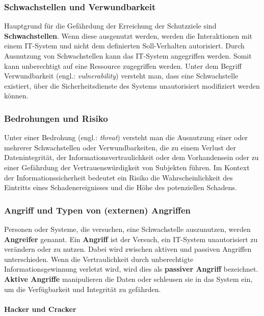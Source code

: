 \subsubsection{Schwachstellen und Verwundbarkeit}

Hauptgrund für die Gefährdung der Erreichung der Schutzziele sind \textbf{Schwachstellen}. Wenn diese ausgenutzt werden, werden die Interaktionen mit einem IT-System und nicht dem definierten Soll-Verhalten autorisiert. Durch Ausnutzung von Schwachstellen kann das IT-System angegriffen werden. Somit kann unberechtigt auf eine Ressource zugegriffen werden\cite[19--20]{nowey2011einleitung}. Unter dem Begriff Verwundbarkeit (engl.: \textit{vulnerability}) versteht man, dass eine Schwachstelle existiert, über die Sicherheitsdienste des Systems unautorisiert modifiziert werden können\cite[38]{eckert2013sicherheit}.

\subsubsection{Bedrohungen und Risiko}

Unter einer Bedrohung (engl.: \textit{threat}) versteht man die Ausnutzung einer oder mehrerer Schwachstellen oder Verwundbarkeiten, die zu einem Verlust der Datenintegrität, der Informationsvertraulichkeit oder dem Vorhandensein  oder zu einer Gefährdung der Vertrauenswürdigkeit von Subjekten führen\cite[39]{eckert2013sicherheit}. Im Kontext der Informationssicherheit bedeutet ein Risiko die Wahrscheinlichkeit des Eintritts eines Schadenereignisses und die Höhe des potenziellen Schadens\cite[15]{nowey2011einleitung}.

\subsubsection{Angriff und Typen von (externen) Angriffen}

Personen oder Systeme, die versuchen, eine Schwachstelle auszunutzen, werden \textbf{Angreifer} genannt. Ein \textbf{Angriff} ist der Versuch, ein IT-System unautorisiert zu verändern oder zu nutzen. Dabei wird zwischen aktiven und passiven Angriffen unterschieden. Wenn die Vertraulichkeit durch unberechtigte Informationsgewinnung verletzt wird, wird dies als \textbf{passiver Angriff} bezeichnet. \textbf{Aktive Angriffe} manipulieren die Daten oder schleusen sie in das System ein, um die Verfügbarkeit und Integrität zu gefährden\cite[20]{nowey2011einleitung}.

\paragraph{Hacker und Cracker}\mbox{}\\

